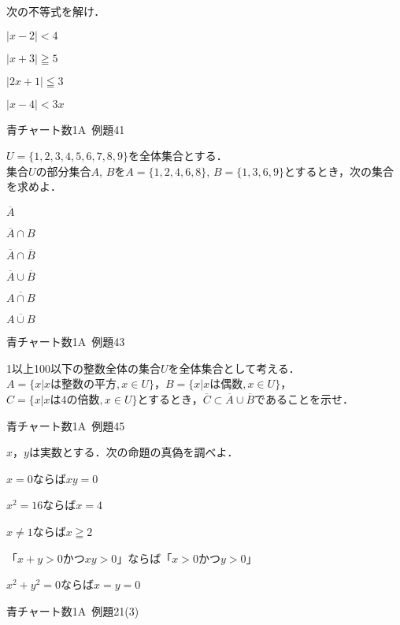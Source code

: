 \documentclass[b4paper, dvipdfmx, 11pt, fleqn, twocolumn, uplatex]{jsarticle}
\newenvironment{tabbedenum}[1]
{\NumTabs{#1}\begin{enumerate*}[label={(\arabic*)},itemjoin={\tab}]}{\end{enumerate*}}
\begin{document}
\begin{screen}
次の不等式を解け．\\
\begin{tabbedenum}{2}
	\item $|x-2|<4$
	\item $|x+3|\geqq5$
	\item $|2x+1|\leqq3$
	\item $|x-4|<3x$
\end{tabbedenum}
\begin{flushright}
    青チャート数1A~例題41
\end{flushright}
\end{screen}


\begin{screen}
$U=\{1, 2, 3, 4, 5, 6, 7, 8, 9\}$を全体集合とする．\\
集合$U$の部分集合$A$, $B$を$A=\{1, 2, 4, 6, 8\}$, $B=\{1, 3, 6, 9\}$とするとき，次の集合を求めよ．\\
\begin{tabbedenum}{3}
	\item $\overline{A}$
	\item $\overline{A}\cap B$
	\item $\overline{A}\cap\overline{B}$
	\item $\overline{A}\cup\overline{B}$
	\item $\overline{A\cap B}$
	\item $\overline{A\cup B}$
\end{tabbedenum}
\begin{flushright}
    青チャート数1A~例題43
\end{flushright}
\end{screen}


\begin{screen}
1以上100以下の整数全体の集合$U$を全体集合として考える．\\
$A=\{x|x\mathrm{は整数の平方}, x\in U\}$，$B=\{x|x\mathrm{は偶数}, x\in U\}$，$C=\{x|x\mathrm{は4の倍数}, x\in U\}$とするとき，$\overline{C}\subset\overline{A}\cup\overline{B}$であることを示せ．
\begin{flushright}
    青チャート数1A~例題45
\end{flushright}
\end{screen}


\begin{screen}
$x$，$y$は実数とする．次の命題の真偽を調べよ．\\
\begin{tabbedenum}{2}
	\item $x=0$ならば$xy=0$
	\item $x^2=16$ならば$x=4$
	\item $x\ne1$ならば$x\geqq2$
	\item 「$x+y>0$かつ$xy>0$」ならば「$x>0$かつ$y>0$」
	\item $x^2+y^2=0$ならば$x=y=0$
\end{tabbedenum}
\begin{flushright}
    青チャート数1A~例題21(3)
\end{flushright}
\end{screen}
\end{document}
